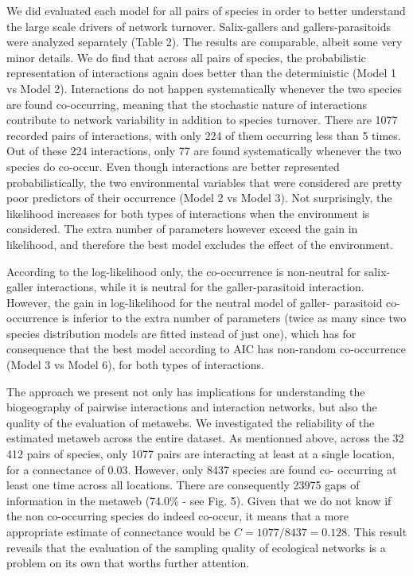 \documentclass[12pt]{article}
\begin{document}
We did evaluated each model for all pairs of species in order to better
understand the large scale drivers of network turnover. Salix-gallers and
gallers-parasitoids were analyzed separately (Table 2). The results are
comparable, albeit some very minor details. We do find that across all pairs
of species, the probabilistic representation of interactions again does better
than the deterministic (Model 1 vs Model 2). Interactions do not happen
systematically whenever the two species are found co-occurring, meaning that
the stochastic nature of interactions contribute to network variability in
addition to species turnover. There are 1077 recorded pairs of interactions,
with only 224 of them occurring less than 5 times. Out of these 224
interactions, only 77 are found systematically whenever the two species do
co-occur. Even though interactions are better represented probabilistically,
the two environmental variables that were considered are pretty poor
predictors of their occurrence (Model 2 vs Model 3). Not surprisingly, the
likelihood increases for both types of interactions when the environment is
considered. The extra number of parameters however exceed the gain in
likelihood, and therefore the best model excludes the effect of the
environment.

According to the log-likelihood only, the co-occurrence is non-neutral for salix-
galler interactions, while it is neutral for the galler-parasitoid
interaction. However, the gain in log-likelihood for the neutral model of galler-
parasitoid co-occurrence is inferior to the extra number of parameters (twice
as many since two species distribution models are fitted instead of just one),
which has for consequence that the best model according to AIC has non-random
co-occurrence (Model 3 vs Model 6), for both types of interactions.

The approach we present not only has implications for understanding the
biogeography of pairwise interactions and interaction networks, but also the
quality of the evaluation of metawebs. We investigated the reliability of the
estimated metaweb across the entire dataset. As mentionned above, across the
32 412 pairs of species, only 1077 pairs are interacting at least at a single
location, for a connectance of 0.03. However, only 8437 species are found co-
occurring at least one time across all locations. There are consequently 23975
gaps of information in the metaweb (74.0\% - see Fig. 5). Given that we do not
know if the non co-occurring species do indeed co-occur, it means that a more
appropriate estimate of connectance would be $C = 1077/8437 = 0.128$. This
result reveails that the evaluation of the sampling quality of ecological networks is a
problem on its own that worths further attention.
\end{document}
